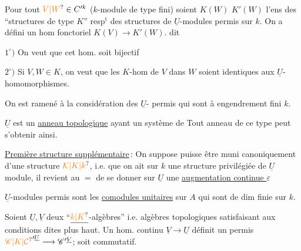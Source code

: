 Pour tout $\unsure{V|W}\in C'^{k}$ ($k$-module de type fini)
soient $K(W)$  $K'(W)$ l'ens des ``structures
de type $K$'' resp$^{\mathrm t}$ des structures de $\underline U$-modules
permis sur $k$. On a défini un hom
fonctoriel $K(V)\longrightarrow K'(W)$.  dit

$1^\circ)$ On veut que cet hom. soit bijectif

$2^\circ)$ Si $V,W\in K$, on veut que les
$K$-hom de $V$ dans $W$ soient identiques aux
$\underline U$-homomorphismes.

On est ramené à la considération des $\underline U$-
permis qui sont à engendrement fini  $k$.

$\underline U$ est un \uline{anneau topologique}  ayant un
système  de  
  Tout
anneau de ce type peut s'obtenir ainsi.

\uline{Première structure supplémentaire}\,: On suppose
  puisse être muni canoniquement
d'une structure $\unsure{\mathcal K|K|k}$, i.e. que on ait
sur $k$ une structure privilégiée de $\underline U$ module,
 il revient au $=$ de se donner sur
$\underline U$ une \uline{augmentation continue $\varepsilon$}

 $\underline U$-modules permis sont les \uline{comodules unitaires}
sur $A$  qui sont de dim finie sur $k$.

Soient $\underline U,\underline V$ deux  ``$\underline{\unsure{k|K}}$-algèbres'' i.e.
algèbres topologiques  satisfaisant aux
conditions dites plus haut. Un hom. continu
 $\underline V\longrightarrow\underline U$
définit un  permis $\unsure{\mathscr C|K|\mathcal C}'^{\underline U}\longrightarrow\mathscr C'^{\underline V}$;
soit commutatif.

